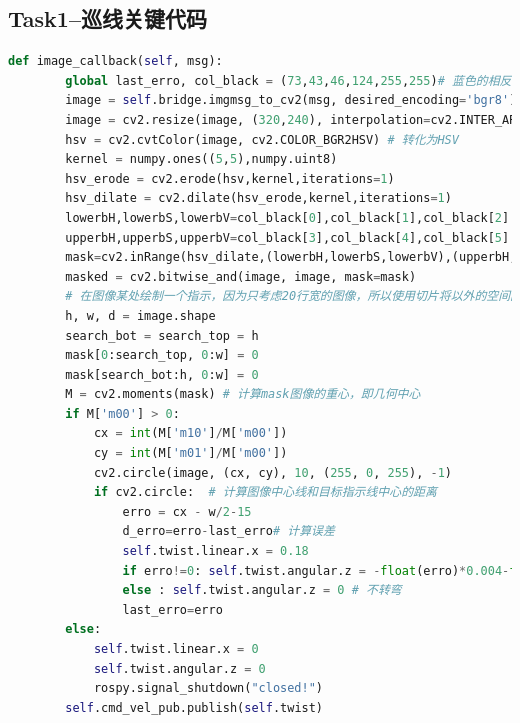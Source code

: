 \documentclass[a4paper,twoside]{article}
\begin{document}
\subsection{Task1--巡线关键代码}
\begin{lstlisting}[language=python, title=巡线关键代码]
def image_callback(self, msg):
        global last_erro, col_black = (73,43,46,124,255,255)# 蓝色的相反色调
        image = self.bridge.imgmsg_to_cv2(msg, desired_encoding='bgr8')
        image = cv2.resize(image, (320,240), interpolation=cv2.INTER_AREA)#提高帧率
        hsv = cv2.cvtColor(image, cv2.COLOR_BGR2HSV) # 转化为HSV
        kernel = numpy.ones((5,5),numpy.uint8)
        hsv_erode = cv2.erode(hsv,kernel,iterations=1)
        hsv_dilate = cv2.dilate(hsv_erode,kernel,iterations=1)
        lowerbH,lowerbS,lowerbV=col_black[0],col_black[1],col_black[2]
        upperbH,upperbS,upperbV=col_black[3],col_black[4],col_black[5]
        mask=cv2.inRange(hsv_dilate,(lowerbH,lowerbS,lowerbV),(upperbH,upperbS,upperbV))
        masked = cv2.bitwise_and(image, image, mask=mask)
        # 在图像某处绘制一个指示，因为只考虑20行宽的图像，所以使用切片将以外的空间区域清空
        h, w, d = image.shape  
        search_bot = search_top = h
        mask[0:search_top, 0:w] = 0
        mask[search_bot:h, 0:w] = 0
        M = cv2.moments(mask) # 计算mask图像的重心，即几何中心
        if M['m00'] > 0:
            cx = int(M['m10']/M['m00'])
            cy = int(M['m01']/M['m00'])
            cv2.circle(image, (cx, cy), 10, (255, 0, 255), -1)
            if cv2.circle:	# 计算图像中心线和目标指示线中心的距离
                erro = cx - w/2-15
                d_erro=erro-last_erro# 计算误差
                self.twist.linear.x = 0.18 
                if erro!=0: self.twist.angular.z = -float(erro)*0.004-float(d_erro)*0.000 #转弯
                else : self.twist.angular.z = 0 # 不转弯
                last_erro=erro
        else:
            self.twist.linear.x = 0
            self.twist.angular.z = 0
            rospy.signal_shutdown("closed!")
        self.cmd_vel_pub.publish(self.twist)
\end{lstlisting}
\newpage
\end{document}

